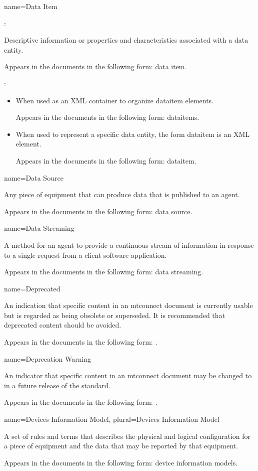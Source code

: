 {
  name={Data Item}
}
{
	:

	Descriptive information or properties and characteristics associated with a \gls{data entity}.

	Appears in the documents in the following form: data item.

	:

    \begin{itemize}
	\item When used as an XML container to organize \gls{dataitem} elements.

	Appears in the documents in the following form: \gls{dataitems}.

	\item When used to represent a specific \gls{data entity}, the form \gls{dataitem} is an XML element.  

	Appears in the documents in the following form: \gls{dataitem}.
    \end{itemize}
}


{
  name={Data Source}
}
{
	Any piece of equipment that can produce data that is published to an \gls{agent}.

	Appears in the documents in the following form: data source.
}


{
  name={Data Streaming}
}
{
	A method for an \gls{agent} to provide a continuous stream of information in response to a single \gls{request} from a client software application.

	Appears in the documents in the following form: \gls{data streaming}.
}


{
  name={Deprecated}
}
{
	An indication that specific content in an \gls{mtconnect document} is currently usable but is regarded as being obsolete or superseded. It is recommended that deprecated content should be avoided.

	Appears in the documents in the following form: \DEPRECATED.
}


{
  name={Deprecation Warning}
}
{
	An indicator that specific content in an \gls{mtconnect document} may be changed to \DEPRECATED in a future release of the standard.

	Appears in the documents in the following form: \DEPRECATIONWARNING.
}


{
  name={Devices Information Model},
  plural={Devices Information Model}
}
{
	A set of rules and terms that describes the physical and logical configuration for a piece of equipment and the data that may be reported by that equipment.    

	Appears in the documents in the following form: \glspl{device information model}.
}


